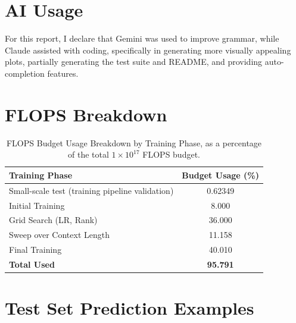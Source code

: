 \documentclass{article}
\begin{document}



\appendix




\section{AI Usage}
For this report, I declare that Gemini was used to improve grammar, while Claude assisted with coding, specifically in generating more visually appealing plots, partially generating the test suite and README, and providing auto-completion features.

\section{FLOPS Breakdown}
\label{sec:flops-breakdown} 

\begin{table}[!htbp] %
\renewcommand{\arraystretch}{1.4}
\centering
{} %
\setlength{\tabcolsep}{8pt}
\begin{tabular}{l S[table-format=2.3]}
    \toprule
    \textbf{Training Phase}           & {\textbf{Budget Usage (\%)}} \\ %
    \midrule
    Small-scale test (training pipeline validation)                & 0.62349 \\ %
    Initial Training                & 8.000 \\ %
    Grid Search (LR, Rank)        & 36.000 \\
    Sweep over Context Length     & 11.158 \\
    Final Training                  & 40.010 \\
    \midrule %
    \textbf{Total Used}             & \bfseries 95.791 \\ %
    \bottomrule
\end{tabular}
\caption{FLOPS Budget Usage Breakdown by Training Phase, as a percentage of the total $1 \times 10^{17}$ FLOPS budget.} 
\label{tab:flops_budget_usage}
\end{table}

\section{Test Set Prediction Examples} %
\label{sec:appendix_predictions} %
\end{document}
